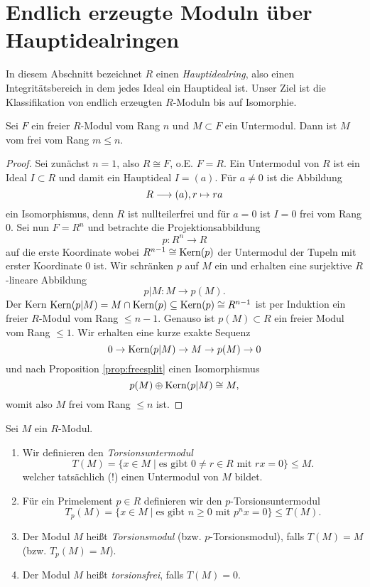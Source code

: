 \documentclass{book}
\begin{document}
\section{Endlich erzeugte Moduln über Hauptidealringen}%
\label{sub:endlich_erzeugte_moduln_uber_hauptidealringen}

In diesem Abschnitt bezeichnet $R$ einen \emph{Hauptidealring}, also einen
Integritätsbereich in dem jedes Ideal ein Hauptideal ist. Unser Ziel ist die
Klassifikation von endlich erzeugten $R$-Moduln bis auf Isomorphie. 

\begin{lem}
    \label{lem:subfree}
    Sei $F$ ein freier $R$-Modul vom Rang $n$ und $M \subset F$ ein Untermodul.
    Dann ist $M$ vom frei vom Rang $m \le n$.
\end{lem}
\begin{proof}
    Sei zunächst $n = 1$, also $R \cong F$, o.E. $F = R$. Ein Untermodul von
    $R$ ist ein Ideal $I \subset R$ und damit ein Hauptideal $I = (a)$. Für $a \ne 0$ ist die Abbildung
    \[
        R \longrightarrow (a), r \mapsto ra
    \]
    ein Isomorphismus, denn $R$ ist nullteilerfrei und für $a = 0$ ist $I = 0$ frei vom Rang $0$. Sei nun $F = R^n$ und betrachte die Projektionsabbildung
    \[
        p: R^n \to R
    \]
    auf die erste Koordinate wobei $R^{n-1} \cong \operatorname{Kern}(p)$ der Untermodul der
    Tupeln mit erster Koordinate $0$ ist. Wir schränken $p$ auf $M$ ein und
    erhalten eine surjektive $R$-lineare Abbildung
    \[
        p|M: M \to p(M).
    \]
    Der Kern $\operatorname{Kern}(p|M) = M \cap \operatorname{Kern}(p) \subseteq \operatorname{Kern}(p) \cong R^{n-1}$ ist
    per Induktion ein freier $R$-Modul vom Rang $\le n-1$. Genauso ist $p(M)
    \subset R$ ein freier Modul vom Rang $\le 1$. Wir erhalten eine kurze exakte Sequenz
    \[
        0 \to \operatorname{Kern}(p|M) \to M \to p(M) \to 0
    \]
    und nach Proposition \ref{prop:freesplit} einen Isomorphismus
    \[
        p(M) \oplus \operatorname{Kern}(p|M) \cong M,
    \]
    womit also $M$ frei vom Rang $\le n$ ist. 
\end{proof}

\begin{defi} Sei $M$ ein $R$-Modul.
    \label{defi:torsion} 
    \begin{enumerate}
        \item Wir definieren den \emph{Torsionsuntermodul}
            \[
                T(M) = \{ x \in M\; | \; \text{es gibt $0 \ne r \in R$ mit $rx = 0$} \} \le M.
            \]
            welcher tatsächlich (!) einen Untermodul von $M$ bildet.
        \item Für ein Primelement $p \in R$ definieren wir den $p$-Torsionsuntermodul
            \[
                T_p(M) = \{ x \in M\; | \; \text{es gibt $n \ge 0 $ mit $p^n x = 0$} \} \le T(M).
            \]
        \item Der Modul $M$ heißt \emph{Torsionsmodul} (bzw. $p$-Torsionsmodul), falls $T(M) = M$ (bzw. $T_p(M) = M$).
        \item Der Modul $M$ heißt \emph{torsionsfrei}, falls $T(M) = 0$. 
    \end{enumerate}    
\end{defi}
\end{document}
